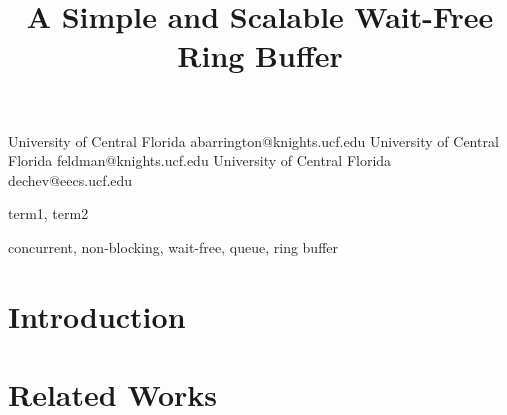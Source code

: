 \documentclass[preprint]{sigplanconf}
\begin{document}
\setlength{\pdfpageheight}{\paperheight}
\setlength{\pdfpagewidth}{\paperwidth}







\title{A Simple and Scalable Wait-Free Ring Buffer}

           {University of Central Florida}
           {abarrington@knights.ucf.edu}
           {University of Central Florida}
           {feldman@knights.ucf.edu}
           {University of Central Florida}
           {dechev@eecs.ucf.edu}

\maketitle


\begin{abstract}
		
\end{abstract}


\terms
term1, term2

\keywords
concurrent, non-blocking, wait-free, queue, ring buffer 

\section{Introduction}
		\label{sec:introduction}
		

\section{Related Works}
		\label{sec:related_work}
		
\end{document}
